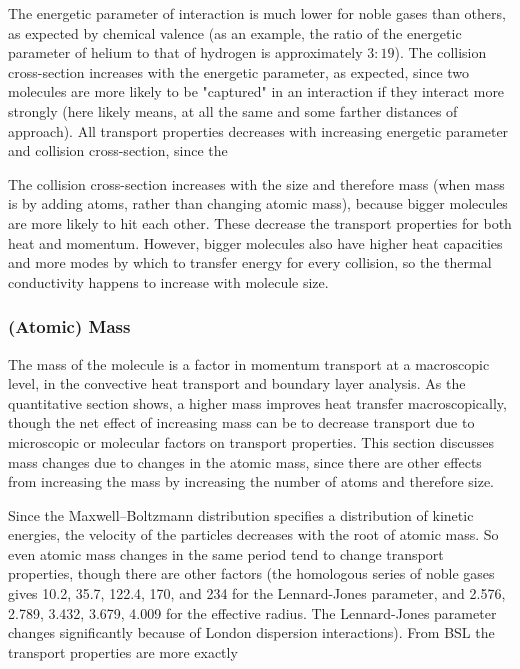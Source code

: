 \documentclass{article}
\begin{document}
The energetic parameter of interaction is much lower for noble gases
than others, as expected by chemical valence (as an example, the
ratio of the energetic parameter of helium to that of hydrogen is
approximately $3:19$). The collision cross-section increases with the
energetic parameter, as expected, since two molecules are more likely
to be "captured" in an interaction if they interact more strongly
(here likely means, at all the same and some farther distances of
approach). All transport properties decreases with increasing energetic
parameter and collision cross-section, since the

The collision cross-section increases with the size and therefore mass
(when mass is by adding atoms, rather than changing atomic mass),
because bigger molecules are more likely to hit each other. These
decrease the transport properties for both heat and momentum. However,
bigger molecules also have higher heat capacities and more modes
by which to transfer energy for every collision, so the thermal
conductivity happens to increase with molecule size.


\subsubsection{(Atomic) Mass}

The mass of the molecule is a factor in momentum transport at a
macroscopic level, in the convective heat transport and boundary layer
analysis. As the quantitative section shows, a higher mass improves
heat transfer macroscopically, though the net effect of increasing mass
can be to decrease transport due to microscopic or molecular factors on
transport properties. This section discusses mass changes due to changes
in the atomic mass, since there are other effects from increasing the
mass by increasing the number of atoms and therefore size.

Since the Maxwell--Boltzmann distribution specifies a distribution of
kinetic energies, the velocity of the particles decreases with the root
of atomic mass. So even atomic mass changes in the same period tend
to change transport properties, though there are other factors (the
homologous series of noble gases gives 10.2, 35.7, 122.4, 170, and
234 for the Lennard-Jones parameter, and 2.576, 2.789, 3.432, 3.679,
4.009 for the effective radius. The Lennard-Jones parameter changes
significantly because of London dispersion interactions). From BSL the
transport properties are more exactly
\end{document}
